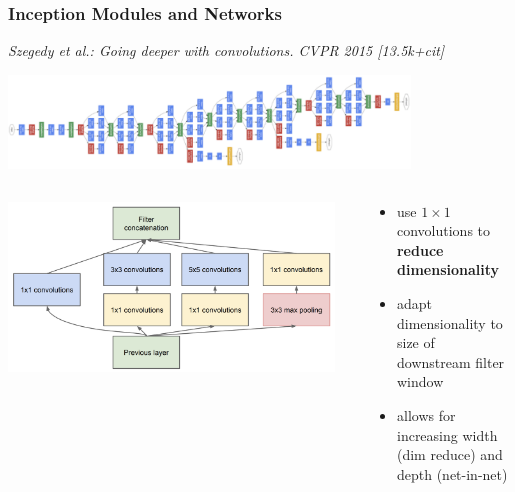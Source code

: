 \documentclass[compress]{beamer}
\newcommand{\textbblue}[1]{{\bf\color{Blue} #1}}
\newcommand{\is}[1]{\setlength{\itemsep}{#1}}
\begin{document}
\begin{frame} \frametitle{Inception Modules and Networks}
{\small \textit{Szegedy et al.: Going deeper with convolutions. CVPR 2015 [13.5k+cit]}}

\begin{center}
\includegraphics[width=0.8\textwidth]{./figures/inception-network.png}
\end{center}

\begin{columns}
\begin{column}{0.4\textwidth}
\includegraphics[width=0.95\textwidth]{./figures/inception-module.png}
\end{column}
\begin{column}{0.55\textwidth}
\begin{itemize} \is{2mm}
\item use $1\times 1$ convolutions to \textbblue{reduce dimensionality}
\item adapt dimensionality to size of downstream filter window
\item allows for increasing width (dim reduce) and depth (net-in-net)
\end{itemize}
\end{column}
\end{columns}
\end{frame}
\end{document}
